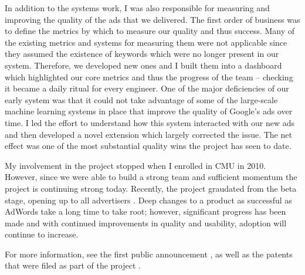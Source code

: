 \documentclass[12pt]{article}
\begin{document}
In addition to the systems work, I was also responsible for measuring and improving the quality of the ads that we delivered. The first order of business was to define the metrics by which to measure our quality and thus success. Many of the existing metrics and systems for measuring them were not applicable since they assumed the existence of keywords which were no longer present in our system. Therefore, we developed new ones and I built them into a dashboard which highlighted our core metrics and thus the progress of the team -- checking it became a daily ritual for every engineer. One of the major deficiencies of our early system was that it could not take advantage of some of the large-scale machine learning systems in place that improve the quality of Google's ads over time. I led the effort to understand how this system interacted with our new ads and then developed a novel extension which largely corrected the issue. The net effect was one of the most substantial quality wins the project has seen to date.

My involvement in the project stopped when I enrolled in CMU in 2010. However, since we were able to build a strong team and sufficient momentum the project is continuing strong today. Recently, the project graudated from the beta stage, opening up to all advertisers \cite{jain}. Deep changes to a product as successful as AdWords take a long time to take root; however, significant progress has been made and with continued improvements in quality and usability, adoption will continue to increase.

For more information, see the first public announcement \cite{gultekin}, as well as the patents that were filed as part of the project \cite{brunsman,brunsman2,brunsman3}.



\end{document}
